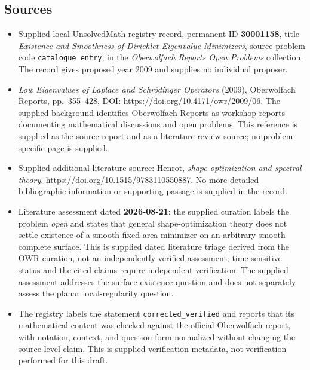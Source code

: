 \documentclass[11pt]{article}
\begin{document}
\subsection{Sources}
\begin{itemize}
\item Supplied local UnsolvedMath registry record, permanent ID \textbf{30001158}, title \emph{Existence and Smoothness of Dirichlet Eigenvalue Minimizers}, source problem code \texttt{catalogue entry}, in the \emph{Oberwolfach Reports Open Problems} collection. The record gives proposed year 2009 and supplies no individual proposer.
\item \emph{Low Eigenvalues of Laplace and Schrödinger Operators} (2009), Oberwolfach Reports, pp.~355--428, DOI: \url{https://doi.org/10.4171/owr/2009/06}. The supplied background identifies Oberwolfach Reports as workshop reports documenting mathematical discussions and open problems. This reference is supplied as the source report and as a literature-review source; no problem-specific page is supplied.
\item Supplied additional literature source: Henrot, \emph{shape optimization and spectral theory}, \url{https://doi.org/10.1515/9783110550887}. No more detailed bibliographic information or supporting passage is supplied in the record.
\item Literature assessment dated \textbf{2026-08-21}: the supplied curation labels the problem \emph{open} and states that general shape-optimization theory does not settle existence of a smooth fixed-area minimizer on an arbitrary smooth complete surface. This is supplied dated literature triage derived from the OWR curation, not an independently verified assessment; time-sensitive status and the cited claims require independent verification. The supplied assessment addresses the surface existence question and does not separately assess the planar local-regularity question.
\item The registry labels the statement \texttt{corrected\_verified} and reports that its mathematical content was checked against the official Oberwolfach report, with notation, context, and question form normalized without changing the source-level claim. This is supplied verification metadata, not verification performed for this draft.
\end{itemize}
\end{document}
